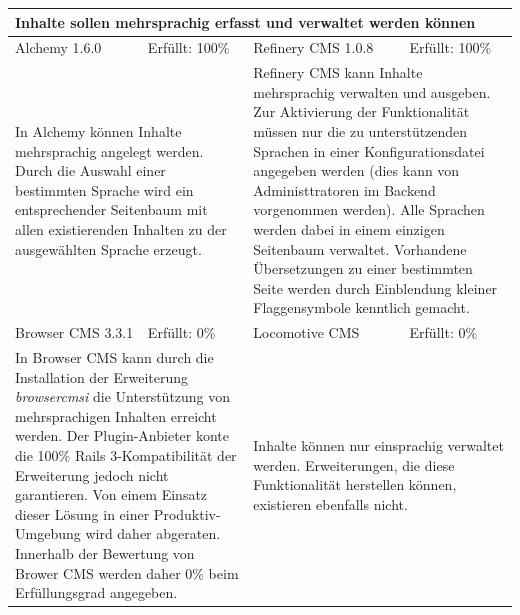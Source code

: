 \newline
\newline
\newline
\begin{tabular}[!ht]{|l|l|l|l|}
\hline
\multicolumn{4}{|p{15cm}|}{\textbf{Inhalte sollen mehrsprachig erfasst und verwaltet werden können}} \\
\hline
  Alchemy 1.6.0 & \cellcolor{green}Erfüllt: 100\% & Refinery CMS 1.0.8 & \cellcolor{green}Erfüllt: 100\% \\
  \hline
  \multicolumn{2}{|p{7.5cm}|}{In Alchemy können Inhalte mehrsprachig angelegt werden. Durch die Auswahl einer bestimmten Sprache wird ein entsprechender Seitenbaum mit allen existierenden Inhalten zu der ausgewählten Sprache erzeugt.}
   & \multicolumn{2}{p{7.5cm}|}{Refinery CMS kann Inhalte mehrsprachig verwalten und ausgeben. Zur Aktivierung der Funktionalität müssen nur die zu unterstützenden Sprachen in einer Konfigurationsdatei angegeben werden (dies kann von Administtratoren im Backend vorgenommen werden). Alle Sprachen werden dabei in einem einzigen Seitenbaum verwaltet. Vorhandene Übersetzungen zu einer bestimmten Seite werden durch Einblendung kleiner Flaggensymbole kenntlich gemacht.} \\
  \hline
  Browser CMS 3.3.1 & \cellcolor{red}Erfüllt: 0\% & Locomotive CMS & \cellcolor{red}Erfüllt: 0\% \\
  \hline
  \multicolumn{2}{|p{7.5cm}|}{In Browser CMS kann  durch die Installation der Erweiterung \emph{browsercmsi} die Unterstützung von mehrsprachigen Inhalten erreicht werden. Der Plugin-Anbieter konte die 100\% Rails 3-Kompatibilität der Erweiterung jedoch nicht garantieren. Von einem Einsatz dieser Lösung in einer Produktiv-Umgebung wird daher abgeraten. Innerhalb der Bewertung von Brower CMS werden daher 0\% beim Erfüllungsgrad angegeben.} & \multicolumn{2}{p{7.5cm}|}{Inhalte können nur einsprachig verwaltet werden. Erweiterungen, die diese Funktionalität herstellen können, existieren ebenfalls nicht.} \\
\hline
\end{tabular}
\newline
\newline
\newline
